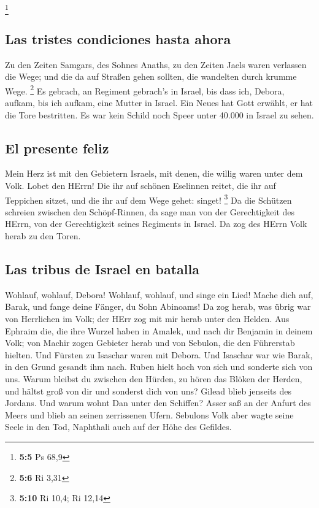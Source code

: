 \footnote{\textbf{5:5} Ps 68,9}

\hypertarget{las-tristes-condiciones-hasta-ahora}{%
\subsection{Las tristes condiciones hasta
ahora}\label{las-tristes-condiciones-hasta-ahora}}

 Zu den Zeiten Samgars, des Sohnes Anaths, zu den Zeiten
Jaels waren verlassen die Wege; und die da auf Straßen gehen sollten,
die wandelten durch krumme Wege. \footnote{\textbf{5:6} Ri 3,31}
 Es gebrach, an Regiment gebrach's in Israel, bis dass
ich, Debora, aufkam, bis ich aufkam, eine Mutter in Israel.
 Ein Neues hat Gott erwählt, er hat die Tore bestritten.
Es war kein Schild noch Speer unter 40.000 in Israel zu sehen.

\hypertarget{el-presente-feliz}{%
\subsection{El presente feliz}\label{el-presente-feliz}}

 Mein Herz ist mit den Gebietern Israels, mit denen, die
willig waren unter dem Volk. Lobet den HErrn!  Die ihr
auf schönen Eselinnen reitet, die ihr auf Teppichen sitzet, und die ihr
auf dem Wege gehet: singet! \footnote{\textbf{5:10} Ri 10,4; Ri 12,14}
 Da die Schützen schreien zwischen den Schöpf-Rinnen, da
sage man von der Gerechtigkeit des HErrn, von der Gerechtigkeit seines
Regiments in Israel. Da zog des HErrn Volk herab zu den Toren.

\hypertarget{las-tribus-de-israel-en-batalla}{%
\subsection{Las tribus de Israel en
batalla}\label{las-tribus-de-israel-en-batalla}}

 Wohlauf, wohlauf, Debora! Wohlauf, wohlauf, und singe
ein Lied! Mache dich auf, Barak, und fange deine Fänger, du Sohn
Abinoams!  Da zog herab, was übrig war von Herrlichen im
Volk; der HErr zog mit mir herab unter den Helden.  Aus
Ephraim die, die ihre Wurzel haben in Amalek, und nach dir Benjamin in
deinem Volk; von Machir zogen Gebieter herab und von Sebulon, die den
Führerstab hielten.  Und Fürsten zu Isaschar waren mit
Debora. Und Isaschar war wie Barak, in den Grund gesandt ihm nach. Ruben
hielt hoch von sich und sonderte sich von uns.  Warum
bleibst du zwischen den Hürden, zu hören das Blöken der Herden, und
hältst groß von dir und sonderst dich von uns?  Gilead
blieb jenseits des Jordans. Und warum wohnt Dan unter den Schiffen?
Asser saß an der Anfurt des Meers und blieb an seinen zerrissenen Ufern.
 Sebulons Volk aber wagte seine Seele in den Tod,
Naphthali auch auf der Höhe des Gefildes.

